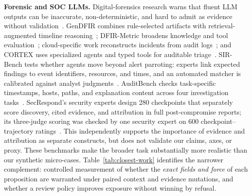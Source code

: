 \documentclass[letterpaper,twocolumn,10pt]{article}
\begin{document}
\textbf{Forensic and SOC LLMs.}  Digital-forensics research warns that fluent
LLM outputs can be inaccurate, non-deterministic, and hard to admit as evidence
without validation~\cite{scanlon2023chatgpt,chernyshev2026capabilities}.
GenDFIR combines rule-selected artifacts with retrieval-augmented timeline
reasoning~\cite{loumachi2025gendfir}; DFIR-Metric broadens knowledge and tool
evaluation~\cite{cherif2025dfirmetric}; cloud-specific work reconstructs
incidents from audit logs~\cite{alharthi2025cloud}; and CORTEX uses specialized
agents and typed tools for auditable triage~\cite{wei2025cortex}.  SIR-Bench
tests whether agents move beyond alert parroting: experts link expected
findings to event identifiers, resources, and times, and an automated matcher
is calibrated against analyst judgments~\cite{begimher2026sirbench}.
AuditBench checks task-specific timestamps, hosts, paths, and explanation
content across four investigation tasks~\cite{anand2026auditbench}.
SecRespond's security experts design 280 checkpoints that separately score
discovery, cited evidence, and attribution in full post-compromise reports; its
three-judge scoring was checked by one security expert on 600
checkpoint--trajectory ratings~\cite{wang2026secrespond}.  This independently
supports the importance of evidence and attribution as separate constructs,
but does not validate our claims, axes, or proxy.  These benchmarks make the
broader task substantially more realistic than our synthetic micro-cases.
Table~\ref{tab:closest-work} identifies the narrower complement: controlled
measurement of whether the \emph{exact fields and force} of each proposition
are warranted under paired context and evidence mutations, and whether a
review policy improves exposure without winning by refusal.
\end{document}
